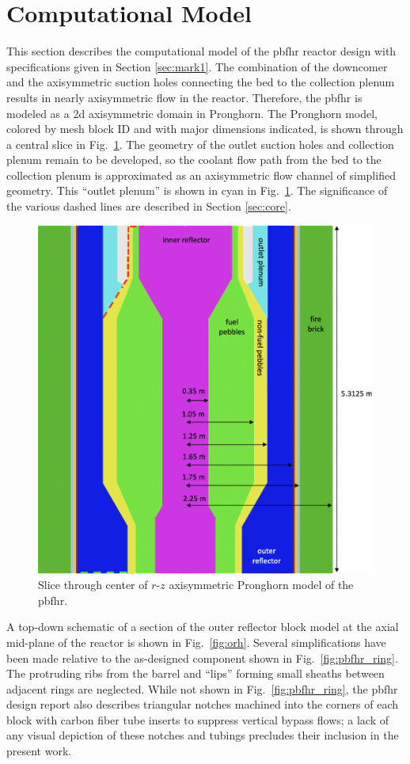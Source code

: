 \section{Computational Model}
\label{sec:pbfhr_model}

This section describes the computational model of the \gls{pbfhr} reactor design with specifications given in Section \ref{sec:mark1}. The combination of the downcomer and the axisymmetric suction holes connecting the bed to the collection plenum results in nearly axisymmetric flow in the reactor. Therefore, the \gls{pbfhr} is modeled as a \gls{2d} axisymmetric domain in Pronghorn. The Pronghorn model, colored by mesh block ID and with major dimensions indicated, is shown through a central slice in Fig.\ \ref{fig:pbfhr_slice}. The geometry of the outlet suction holes and collection plenum remain to be developed, so the coolant flow path from the bed to the collection plenum is approximated as an axisymmetric flow channel of simplified geometry. This ``outlet plenum'' is shown in cyan in Fig.\ \ref{fig:pbfhr_slice}. The significance of the various dashed lines are described in Section \ref{sec:core}.

\begin{figure}[h!]
\centering
\hspace{1cm}
\includegraphics[width=0.5\linewidth]{figs/pbfhr_slice.png}
\caption{Slice through center of $r$-$z$ axisymmetric Pronghorn model of the \gls{pbfhr}.}
\label{fig:pbfhr_slice}
\end{figure}

A top-down schematic of a section of the outer reflector block model at the axial mid-plane of the reactor is shown in Fig.\ \ref{fig:orh}. Several simplifications have been made relative to the as-designed component shown in Fig.\ \ref{fig:pbfhr_ring}. The protruding ribs from the barrel and ``lips'' forming small sheaths between adjacent rings are neglected. While not shown in Fig.\ \ref{fig:pbfhr_ring}, the \gls{pbfhr} design report also describes triangular notches machined into the corners of each block with carbon fiber tube inserts to suppress vertical bypass flows; a lack of any visual depiction of these notches and tubings precludes their inclusion in the present work. 

